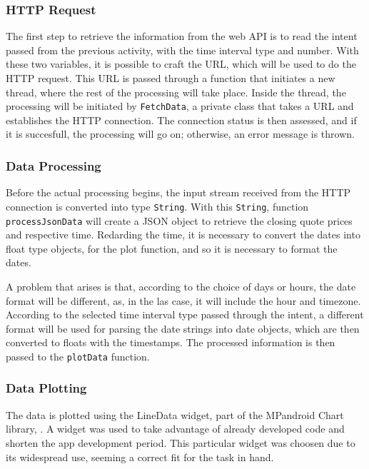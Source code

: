 \documentclass{article}
\begin{document}
\subsubsection{HTTP Request}
The first step to retrieve the information from the web API is to read the intent passed from the previous activity, with the time interval type and number.
With these two variables, it is possible to craft the URL, which will be used to do the HTTP request.
This URL is passed through a function that initiates a new thread, where the rest of the processing will take place.
Inside the thread, the processing will be initiated by \texttt{FetchData}, a private class that takes a URL and establishes the HTTP connection.
The connection status is then assessed, and if it is succesfull, the processing will go on; otherwise, an error message is thrown.

\subsubsection{Data Processing}
Before the actual processing begins, the input stream received from the HTTP connection is converted into type \texttt{String}.
With this \texttt{String}, function \texttt{processJsonData} will create a JSON object to retrieve the closing quote prices and respective time.
Redarding the time, it is necessary to convert the dates into float type objects, for the plot function, and so it is necessary to format the dates.

A problem that arises is that, according to the choice of days or hours, the date format will be different, as, in the las case, it will include the hour and timezone.
According to the selected time interval type passed through the intent, a different format will be used for parsing the date strings into date objects, which are then converted to floats with the timestamps.
The processed information is then passed to the \texttt{plotData} function.

\subsubsection{Data Plotting}
The data is plotted using the LineData widget, part of the MPandroid Chart library, \cite{MPAndroidChart}.
A widget was used to take advantage of already developed code and shorten the app development period.
This particular widget was choosen due to its widespread use, seeming a correct fit for the task in hand.
\end{document}
